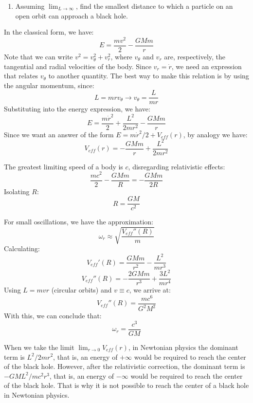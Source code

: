 \documentclass[11pt]{article}
\begin{document}
\begin{pproblem}
\begin{enumerate}[label=\textbf{\alph*)}]
        \item Assuming \( \lim_{L \to \infty}\), find the smallest distance to which a particle on an open orbit can approach a black hole.  
    \end{enumerate}
    \begin{pssolution*}{}{}
        \begin{alternativas}
            \item In the classical form, we have:
            \[E = \frac{mv^2}{2}-\frac{GMm}{r}\]
            Note that we can write \(v^2 = v_\theta^2+ v_r^2\), where \(v_\theta\) and \(v_r\) are, respectively, the tangential and radial velocities of the body. Since \(v_r = \dot{r}\), we need an expression that relates \(v_\theta\) to another quantity. The best way to make this relation is by using the angular momentum, since:
            \[L = mrv_\theta \rightarrow v_\theta = \frac{L}{mr}\]
            Substituting into the energy expression, we have:
            \[E = \frac{m\dot{r}^2}{2}+\frac{L^2}{2mr^2} - \frac{GMm}{r}\]
            Since we want an answer of the form \(E = m\dot{r}^2/2 + V_{eff}(r)\), by analogy we have:
            \[\boxed{V_{eff}(r) = -\frac{GMm}{r}+\frac{L^2}{2mr^2}}\]

            \item The greatest limiting speed of a body is \(c\), disregarding relativistic effects:
            \[\frac{mc^2}{2}-\frac{GMm}{R} = -\frac{GMm}{2R}\]
            Isolating \(R\):
            \[\boxed{R = \frac{GM}{c^2}}\]

            \item For small oscillations, we have the approximation:
            \[\omega_r \approx \sqrt{\frac{V_{eff}''(R)}{m}}\]
            Calculating:
            \[V_{eff}'(R) = \frac{GMm}{r^2}-\frac{L^2}{mr^3}\]
            \[V_{eff}''(R) = -\frac{2GMm}{r^3}+\frac{3L^2}{mr^4}\]
            Using \(L = mvr\) (circular orbits) and \(v\equiv c\), we arrive at:
            \[V_{eff}''(R) = \frac{mc^6}{G^2M^2}\]
            With this, we can conclude that:
            \[\omega_r = \frac{c^3}{GM}\]

            \item When we take the limit \(\lim_{r\rightarrow 0}V_{eff}(r)\), in Newtonian physics the dominant term is \(L^2/2mr^2\), that is, an energy of \(+\infty\) would be required to reach the center of the black hole. However, after the relativistic correction, the dominant term is \(-GML^2/mc^2r^3\), that is, an energy of \(-\infty\) would be required to reach the center of the black hole. That is why it is not possible to reach the center of a black hole in Newtonian physics.
            

\end{alternativas}
\end{pssolution*}
\end{pproblem}
\end{document}
